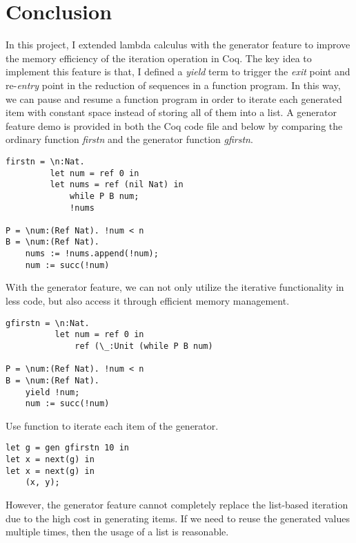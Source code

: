 \section{Conclusion}
\label{sec:conclusion}
In this project, I extended lambda calculus with the generator feature to improve the memory efficiency of the iteration operation in Coq. The key idea to implement this feature is that, I defined a \textit{yield} term to trigger the \textit{exit} point and re-\textit{entry} point in the reduction of sequences in a function program. In this way, we can pause and resume a function program in order to iterate each generated item with constant space instead of storing all of them into a list. A generator feature demo is provided in both the Coq code file and below by comparing the ordinary function \textit{firstn} and the generator function \textit{gfirstn}. 
\begin{lstlisting}
firstn = \n:Nat.
         let num = ref 0 in 
         let nums = ref (nil Nat) in 
             while P B num;
             !nums

P = \num:(Ref Nat). !num < n
B = \num:(Ref Nat). 
    nums := !nums.append(!num); 
    num := succ(!num)
\end{lstlisting}
With the generator feature, we can not only utilize the iterative functionality in less code, but also access it through efficient memory management.
\begin{lstlisting}
gfirstn = \n:Nat.
          let num = ref 0 in 
              ref (\_:Unit (while P B num)

P = \num:(Ref Nat). !num < n
B = \num:(Ref Nat). 
    yield !num; 
    num := succ(!num)
\end{lstlisting}
Use \nt function to iterate each item of the generator.
\begin{lstlisting}
let g = gen gfirstn 10 in
let x = next(g) in
let x = next(g) in
    (x, y);
\end{lstlisting}
However, the generator feature cannot completely replace the list-based iteration due to the high cost in generating items. If we need to reuse the generated values multiple times, then the usage of a list is reasonable.

